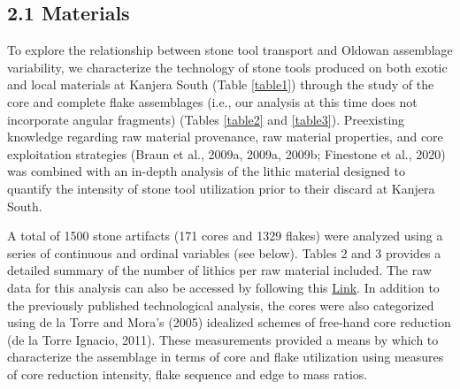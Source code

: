 \documentclass[]{elsarticle} %
\begin{document}
\hypertarget{materials}{%
\subsection{2.1 Materials}\label{materials}}

To explore the relationship between stone tool transport and Oldowan
assemblage variability, we characterize the technology of stone tools
produced on both exotic and local materials at Kanjera South (Table
\ref{table1}) through the study of the core and complete flake
assemblages (i.e., our analysis at this time does not incorporate
angular fragments) (Tables \ref{table2} and \ref{table3}). Preexisting
knowledge regarding raw material provenance, raw material properties,
and core exploitation strategies (Braun et al., 2009a, 2009a, 2009b;
Finestone et al., 2020) was combined with an in-depth analysis of the
lithic material designed to quantify the intensity of stone tool
utilization prior to their discard at Kanjera South.

A total of 1500 stone artifacts (171 cores and 1329 flakes) were
analyzed using a series of continuous and ordinal variables (see below).
Tables 2 and 3 provides a detailed summary of the number of lithics per
raw material included. The raw data for this analysis can also be
accessed by following this
\href{https://www.dropbox.com/home/Models_and_Runs/Kanjera\%20South}{Link}.
In addition to the previously published technological analysis, the
cores were also categorized using de la Torre and Mora's (2005)
idealized schemes of free-hand core reduction (de la Torre Ignacio,
2011). These measurements provided a means by which to characterize the
assemblage in terms of core and flake utilization using measures of core
reduction intensity, flake sequence and edge to mass ratios.
\end{document}
